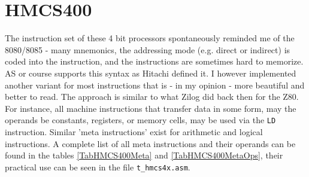 \documentclass[12pt,twoside]{report}
\newcommand{\tty}[1]{{\tt #1}}
\newcommand{\asname}{{AS}}
\begin{document}

\section{HMCS400}

The instruction set of these 4 bit processors spontaneously reminded
me of the 8080/8085 - many mnemonics, the addressing mode (e.g.
direct or indirect) is coded into the instruction, and the
instructions are sometimes hard to memorize.  \asname{} or course
supports this syntax as Hitachi defined it.  I however
implemented another variant for most instructions that is - in my
opinion - more beautiful and better to read.  The approach is
similar to what Zilog did back then for the Z80.  For instance,
all machine instructions that transfer data in some form, may the
operands be constants, registers, or memory cells, may be used
via the \tty{LD} instruction.  Similar 'meta instructions' exist
for arithmetic and logical instructions.  A complete list of all
meta instructions and their operands can be found in the tables
\ref{TabHMCS400Meta} and \ref{TabHMCS400MetaOps}, their practical
use can be seen in the file \tty{t\_hmcs4x.asm}.
\end{document}

